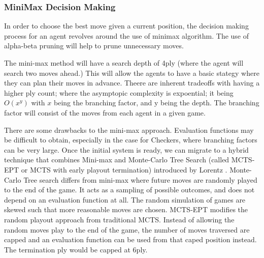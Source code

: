 \documentclass[12pt,a4paper]{article}
\begin{document}
\subsubsection{MiniMax Decision Making}

    In order to choose the best move given a current position, the decision making process for an agent revolves around the use of minimax algorithm. The use of alpha-beta pruning will help to prune unnecessary moves.

    The mini-max method will have a search depth of 4ply (where the agent will search two moves ahead.) This will allow the agents to have a basic stategy where they can plan their moves in advance. Theere are inherent tradeoffs with having a higher ply count; where the asymptopic complexity is expoential; it being $O(x^y)$ with $x$ being the branching factor, and y being the depth. The branching factor will consist of the moves from each agent in a given game.

    There are some drawbacks to the mini-max approach. Evaluation functions may be difficult to obtain, especially in the case for Checkers, where branching factors can be very large. Once the initial system is ready, we can migrate to a hybrid technique that combines Mini-max and Monte-Carlo Tree Search (called MCTS-EPT or MCTS with early playout termination) introduced by Lorentz \cite{lorentz_using_2016}. Monte-Carlo Tree search differs from mini-max where future moves are randomly played to the end of the game. It acts as a sampling of possible outcomes, and does not depend on an evaluation function at all. The random simulation of games are skewed such that more reasonable moves are chosen. MCTS-EPT modifies the random playout approach from traditional MCTS. Instead of allowing the random moves play to the end of the game, the number of moves traversed are capped and an evaluation function can be used from that caped position instead. The termination ply would be capped at 6ply.
    
\end{document}
